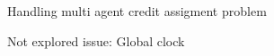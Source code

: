 \documentclass[presentation]{beamer}\mode<presentation>{\usetheme{AMSBolognaFC}}
\begin{document}
\begin{frame}{Handling multi agent credit assigment problem}

\end{frame}

\begin{frame}{Not explored issue: Global clock}

\end{frame}


\section*{}

\frame{\titlepage}

\section*{\refname}

\begin{frame}{\refname}
	\scriptsize
	\nocite{*}
	\printbibliography
\end{frame}

\end{document}
